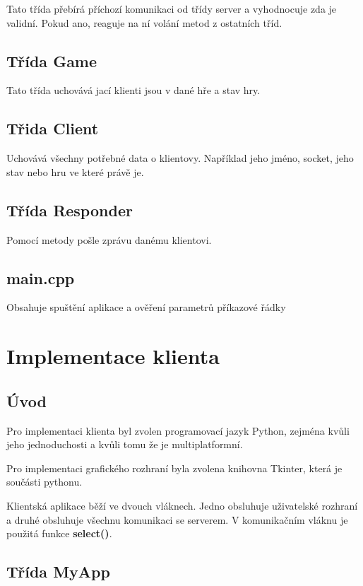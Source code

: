 \documentclass[12pt]{report}
\begin{document}
	Tato třída přebírá příchozí komunikaci od třídy server a vyhodnocuje zda je validní. Pokud ano, reaguje na ní volání metod z ostatních tříd.
	
	\section{Třída Game}
	
	Tato třída uchovává jací klienti jsou v dané hře a stav hry.
	
	\section{Třida Client}
	
	Uchovává všechny potřebné data o klientovy. Například jeho jméno, socket, jeho stav nebo hru ve které právě je.
	
	\section{Třída Responder}
	
	Pomocí metody pošle zprávu danému klientovi.
	
	\section{main.cpp}
	
	Obsahuje spuštění aplikace a ověření parametrů příkazové řádky

	\chapter{Implementace klienta}
	
	
	\section{Úvod}
	
	Pro implementaci klienta byl zvolen programovací jazyk Python, zejména kvůli jeho jednoduchosti a kvůli tomu že je multiplatformní.
	
	Pro implementaci grafického rozhraní byla zvolena knihovna Tkinter, která je součásti pythonu.
	
	Klientská aplikace běží ve dvouch vláknech. Jedno obsluhuje uživatelské rozhraní a druhé obsluhuje všechnu komunikaci se serverem. V komunikačním vláknu je použitá funkce \textbf{select()}.
	
	\section{Třída MyApp}
	
\end{document}
